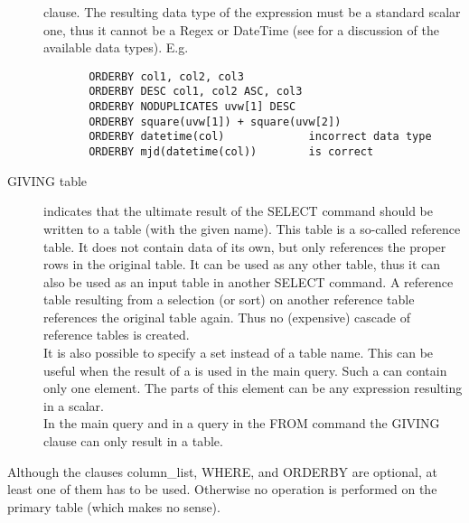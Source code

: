 \begin{description}
        clause.
       The resulting data type of the expression must
       be a standard scalar one, thus it cannot be a Regex or
       DateTime (see  for a discussion
       of the available data types).
       E.g.
       \begin{verbatim}
       ORDERBY col1, col2, col3
       ORDERBY DESC col1, col2 ASC, col3
       ORDERBY NODUPLICATES uvw[1] DESC
       ORDERBY square(uvw[1]) + square(uvw[2])
       ORDERBY datetime(col)             incorrect data type
       ORDERBY mjd(datetime(col))        is correct
       \end{verbatim}
  \item[ \label{TAQL:GIVING}GIVING table ]
       indicates that the ultimate result of the SELECT command should be
       written to a table (with the given name). This table is a
       so-called reference table.
       It does not contain data of its own, but only references the
       proper rows in the original table. It can be used
       as any other table, thus it can also be used as an input table in
       another SELECT command. A reference table resulting from
       a selection (or sort) on another reference table references the
       original table again. Thus no (expensive) cascade of reference
       tables is created.
       \\It is also possible to specify a set instead of a table name.
       This can be useful when the result of a
        is used in the main query.
       Such a  can contain only one element.
       The parts of this element can be any expression resulting in a scalar.
       \\In the main query and in a query in the FROM command the
       GIVING clause can only result in a table.
\end{description}
Although the clauses column\_list, WHERE, and ORDERBY are optional,
at least one of them has to be used. Otherwise no operation is
performed on the primary table (which makes no sense).


